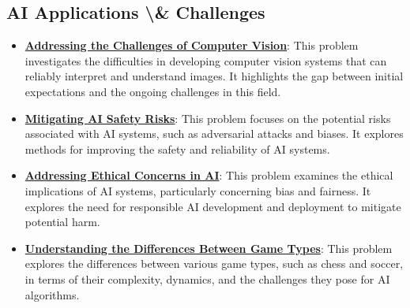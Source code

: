 \documentclass{article}%
\begin{document}
%
\subsection{AI Applications \textbackslash{}\& Challenges}%
\label{subsec:AIApplicationsChallenges}%
\begin{itemize}[leftmargin=*]%
\item \href{https://purdue.brightspace.com/d2l/common/assets/pdfjs-d2l-dist/1.0.14-legacy/web/viewer.html?file=%2Fcontent%2Fenforced%2F1095467-wl.202510.CS.24300.001%2F02L2-Intro.pdf%3Fou%3D1095467&lang=en-us&container=d2l-fileviewer-rendered-pdf&fullscreen=d2l-fileviewer-rendered-pdf-dialog&height=667#page=15}{\textbf{Addressing the Challenges of Computer Vision}}: This problem investigates the difficulties in developing computer vision systems that can reliably interpret and understand images. It highlights the gap between initial expectations and the ongoing challenges in this field.%
\item \href{https://purdue.brightspace.com/d2l/common/assets/pdfjs-d2l-dist/1.0.14-legacy/web/viewer.html?file=%2Fcontent%2Fenforced%2F1095467-wl.202510.CS.24300.001%2F02L2-Intro.pdf%3Fou%3D1095467&lang=en-us&container=d2l-fileviewer-rendered-pdf&fullscreen=d2l-fileviewer-rendered-pdf-dialog&height=667#page=19}{\textbf{Mitigating AI Safety Risks}}: This problem focuses on the potential risks associated with AI systems, such as adversarial attacks and biases. It explores methods for improving the safety and reliability of AI systems.%
\item \href{https://purdue.brightspace.com/d2l/common/assets/pdfjs-d2l-dist/1.0.14-legacy/web/viewer.html?file=%2Fcontent%2Fenforced%2F1095467-wl.202510.CS.24300.001%2F02L2-Intro.pdf%3Fou%3D1095467&lang=en-us&container=d2l-fileviewer-rendered-pdf&fullscreen=d2l-fileviewer-rendered-pdf-dialog&height=667#page=20}{\textbf{Addressing Ethical Concerns in AI}}: This problem examines the ethical implications of AI systems, particularly concerning bias and fairness. It explores the need for responsible AI development and deployment to mitigate potential harm.%
\item \href{https://purdue.brightspace.com/d2l/common/assets/pdfjs-d2l-dist/1.0.14-legacy/web/viewer.html?file=%2Fcontent%2Fenforced%2F1095467-wl.202510.CS.24300.001%2F02L2-Intro.pdf%3Fou%3D1095467&lang=en-us&container=d2l-fileviewer-rendered-pdf&fullscreen=d2l-fileviewer-rendered-pdf-dialog&height=667#page=27}{\textbf{Understanding the Differences Between Game Types}}: This problem explores the differences between various game types, such as chess and soccer, in terms of their complexity, dynamics, and the challenges they pose for AI algorithms.%

\end{itemize}
\end{document}

